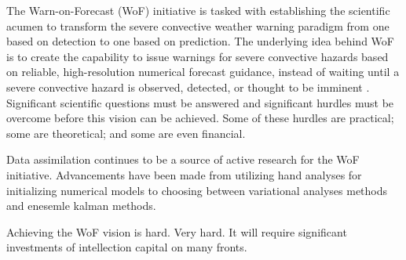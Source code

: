 


The Warn-on-Forecast (WoF) initiative is tasked with establishing the scientific acumen to transform the severe convective weather warning paradigm from one based on detection to one based on prediction. The underlying idea behind WoF is to create the capability to issue warnings for severe convective hazards based on reliable, high-resolution numerical forecast guidance, instead of waiting until a severe convective hazard is observed, detected, or thought to be imminent \citep{stensrud2009wof}. Significant scientific questions must be answered and significant hurdles must be overcome before this vision can be achieved. Some of these hurdles are practical; some are theoretical; and some are even financial.


Data assimilation continues to be a source of active research for the WoF initiative. Advancements have been made from utilizing hand analyses for initializing numerical models to choosing between variational analyses methods and enesemle kalman methods.

Achieving the WoF vision is hard. Very hard. It will require significant investments of intellection capital on many fronts.


